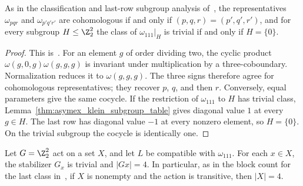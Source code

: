 \begin{lemma}
    \label{thm:asymex_klein_distinct_classes}
    \leanok
    As in the classification and last-row subgroup analysis
    of~\cite[Section~6]{GarreRubio2023MPOSym}, the representatives
    $\omega_{pqr}$ and $\omega_{p'q'r'}$ are cohomologous if and only if
    $(p,q,r)=(p',q',r')$, and for every subgroup $H\leq\Z_2^2$ the class of
    $\omega_{111}|_H$ is trivial if and only if $H=\{0\}$.
\end{lemma}

\begin{proof}
    \leanok
    This is~\cite[``Distinct Klein-four classes and the last-row
        restriction'']{QICLean2026Blueprint}.
    For an element $g$ of order dividing two, the cyclic product
    $\omega(g,0,g)\omega(g,g,g)$ is invariant under multiplication by a
    three-coboundary. Normalization reduces it to $\omega(g,g,g)$.
    The three signs therefore agree for cohomologous representatives;
    they recover $p$, $q$, and then $r$. Conversely, equal parameters give
    the same cocycle. If the restriction of $\omega_{111}$ to $H$ has
    trivial class, Lemma~\ref{thm:asymex_klein_subgroup_table} gives
    diagonal value $1$ at every $g\in H$.
    The last row has diagonal value $-1$ at every nonzero element, so
    $H=\{0\}$. On the trivial subgroup the cocycle is identically one.
\end{proof}


\begin{lemma}
    \label{thm:asymex_klein_four_blocks}
    \leanok
    Let $G=\Z_2^2$ act on a set $X$, and let $L$ be compatible with
    $\omega_{111}$. For each $x\in X$, the stabilizer $G_x$ is trivial
    and $|Gx|=4$. In particular, as in the block count for the last class
    in~\cite[Section~6]{GarreRubio2023MPOSym}, if $X$ is nonempty and the
    action is transitive, then $|X|=4$.
\end{lemma}

